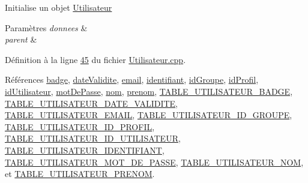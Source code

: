 Initialise un objet \hyperlink{class_utilisateur}{Utilisateur} 
\begin{DoxyParams}{Paramètres}
{\em donnees} & \\
\hline
{\em parent} & \\
\hline
\end{DoxyParams}


Définition à la ligne \hyperlink{_utilisateur_8cpp_source_l00045}{45} du fichier \hyperlink{_utilisateur_8cpp_source}{Utilisateur.\+cpp}.



Références \hyperlink{_utilisateur_8h_source_l00075}{badge}, \hyperlink{_utilisateur_8h_source_l00072}{date\+Validite}, \hyperlink{_utilisateur_8h_source_l00076}{email}, \hyperlink{_utilisateur_8h_source_l00073}{identifiant}, \hyperlink{_utilisateur_8h_source_l00069}{id\+Groupe}, \hyperlink{_utilisateur_8h_source_l00068}{id\+Profil}, \hyperlink{_utilisateur_8h_source_l00067}{id\+Utilisateur}, \hyperlink{_utilisateur_8h_source_l00074}{mot\+De\+Passe}, \hyperlink{_utilisateur_8h_source_l00070}{nom}, \hyperlink{_utilisateur_8h_source_l00071}{prenom}, \hyperlink{_utilisateur_8h_source_l00035}{T\+A\+B\+L\+E\+\_\+\+U\+T\+I\+L\+I\+S\+A\+T\+E\+U\+R\+\_\+\+B\+A\+D\+GE}, \hyperlink{_utilisateur_8h_source_l00032}{T\+A\+B\+L\+E\+\_\+\+U\+T\+I\+L\+I\+S\+A\+T\+E\+U\+R\+\_\+\+D\+A\+T\+E\+\_\+\+V\+A\+L\+I\+D\+I\+TE}, \hyperlink{_utilisateur_8h_source_l00036}{T\+A\+B\+L\+E\+\_\+\+U\+T\+I\+L\+I\+S\+A\+T\+E\+U\+R\+\_\+\+E\+M\+A\+IL}, \hyperlink{_utilisateur_8h_source_l00029}{T\+A\+B\+L\+E\+\_\+\+U\+T\+I\+L\+I\+S\+A\+T\+E\+U\+R\+\_\+\+I\+D\+\_\+\+G\+R\+O\+U\+PE}, \hyperlink{_utilisateur_8h_source_l00028}{T\+A\+B\+L\+E\+\_\+\+U\+T\+I\+L\+I\+S\+A\+T\+E\+U\+R\+\_\+\+I\+D\+\_\+\+P\+R\+O\+F\+IL}, \hyperlink{_utilisateur_8h_source_l00027}{T\+A\+B\+L\+E\+\_\+\+U\+T\+I\+L\+I\+S\+A\+T\+E\+U\+R\+\_\+\+I\+D\+\_\+\+U\+T\+I\+L\+I\+S\+A\+T\+E\+UR}, \hyperlink{_utilisateur_8h_source_l00033}{T\+A\+B\+L\+E\+\_\+\+U\+T\+I\+L\+I\+S\+A\+T\+E\+U\+R\+\_\+\+I\+D\+E\+N\+T\+I\+F\+I\+A\+NT}, \hyperlink{_utilisateur_8h_source_l00034}{T\+A\+B\+L\+E\+\_\+\+U\+T\+I\+L\+I\+S\+A\+T\+E\+U\+R\+\_\+\+M\+O\+T\+\_\+\+D\+E\+\_\+\+P\+A\+S\+SE}, \hyperlink{_utilisateur_8h_source_l00030}{T\+A\+B\+L\+E\+\_\+\+U\+T\+I\+L\+I\+S\+A\+T\+E\+U\+R\+\_\+\+N\+OM}, et \hyperlink{_utilisateur_8h_source_l00031}{T\+A\+B\+L\+E\+\_\+\+U\+T\+I\+L\+I\+S\+A\+T\+E\+U\+R\+\_\+\+P\+R\+E\+N\+OM}.


